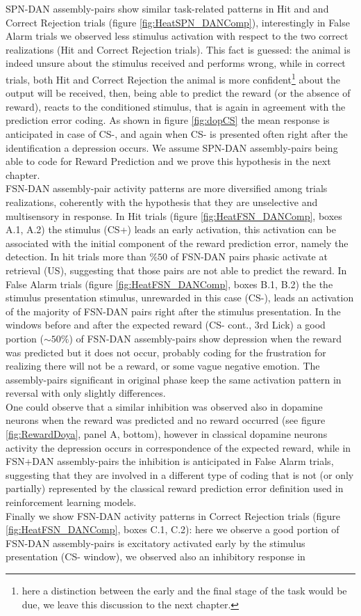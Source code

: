 SPN-DAN assembly-pairs show similar task-related patterns in Hit and and Correct Rejection trials (figure \ref{fig:HeatSPN_DANComp}), interestingly in False Alarm trials we observed less stimulus activation with respect to the two correct realizations (Hit and Correct Rejection trials). This fact is guessed: the animal is indeed unsure about the stimulus received and performs wrong, while in correct trials, both Hit and Correct Rejection the animal is more confident\footnote{here a distinction between the early and the final stage of the task would be due, we leave this discussion to the next chapter.} about the output will be received, then, being able to predict the reward (or the absence of reward), reacts to the conditioned stimulus, that is again in agreement with the prediction error coding. As shown in figure \ref{fig:dopCS} the mean response is anticipated in case of CS-, and again when CS- is presented often right after the identification a depression occurs. We assume SPN-DAN assembly-pairs being able to code for Reward Prediction and we prove this hypothesis in the next chapter.\\FSN-DAN assembly-pair activity patterns are more diversified among trials realizations, coherently with the hypothesis that they are unselective and multisensory in response. In Hit trials (figure \ref{fig:HeatFSN_DANComp}, boxes A.1, A.2) the stimulus (CS+) leads an early activation, this activation can be associated with the initial component of the reward prediction error, namely the detection. In hit trials more than $\% 50$ of FSN-DAN pairs phasic activate at retrieval (US), suggesting that those pairs are not able to predict the reward. In False Alarm trials (figure \ref{fig:HeatFSN_DANComp}, boxes B.1, B.2) the the stimulus presentation stimulus, unrewarded in this case (CS-), leads an activation of the majority of FSN-DAN pairs right after the stimulus presentation. In the windows before and after the expected reward (CS- cont., 3rd Lick) a good portion ($\sim50\%$) of FSN-DAN assembly-pairs show depression when the reward was predicted but it does not occur, probably coding for the frustration for realizing there will not be a reward, or some vague negative emotion. The assembly-pairs significant in original phase keep the same activation pattern in reversal with only slightly differences.\\One could observe that a similar inhibition was observed also in dopamine neurons when the reward was predicted and no reward occurred (see figure \ref{fig:RewardDoya}, panel A, bottom), however in classical dopamine neurons activity the depression occurs in correspondence of the expected reward, while in FSN+DAN assembly-pairs the inhibition is anticipated in False Alarm trials, suggesting that they are involved in a different type of coding that is not (or only partially) represented by the classical reward prediction error definition used in reinforcement learning models.\\Finally we show FSN-DAN activity patterns in Correct Rejection trials (figure \ref{fig:HeatFSN_DANComp}, boxes C.1, C.2): here we observe a good portion of FSN-DAN assembly-pairs is excitatory activated early by the stimulus presentation (CS- window), we observed also an inhibitory response in 